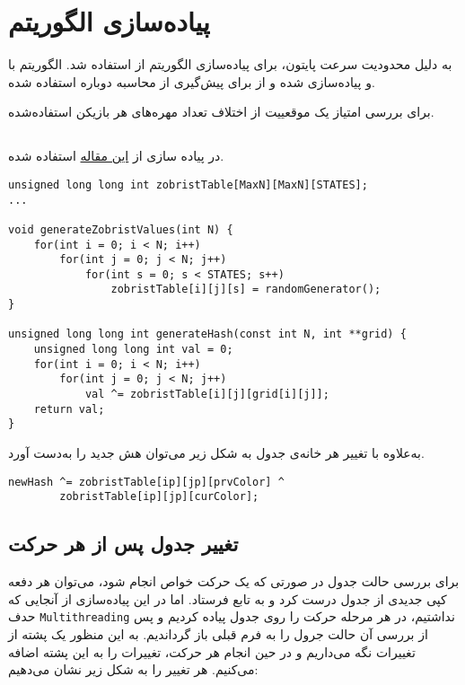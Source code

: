 \chapter{پیاده‌سازی الگوریتم }
به دلیل محدودیت سرعت پایتون، برای پیاده‌سازی الگوریتم
از 
استفاده شد.
الگوریتم با 
و
پیاده‌سازی شده
و از 
برای پیش‌گیری از محاسبه دوباره استفاده شده.

برای بررسی امتیاز یک موقعییت از اختلاف تعداد مهره‌های هر بازیکن استفاده‌شده.

\section{}
در پیاده سازی 
از
\href{https://www.geeksforgeeks.org/minimax-algorithm-in-game-theory-set-5-zobrist-hashing/}{این مقاله}
استفاده شده.

\lstset{language=C++}
\begin{latin}
\begin{lstlisting}
unsigned long long int zobristTable[MaxN][MaxN][STATES];
...

void generateZobristValues(int N) {
	for(int i = 0; i < N; i++)
		for(int j = 0; j < N; j++)
			for(int s = 0; s < STATES; s++)
				zobristTable[i][j][s] = randomGenerator();
}

unsigned long long int generateHash(const int N, int **grid) {
	unsigned long long int val = 0;
	for(int i = 0; i < N; i++)
		for(int j = 0; j < N; j++)
			val ^= zobristTable[i][j][grid[i][j]];
	return val;
}
\end{lstlisting}
\end{latin}

به‌علاوه با تغییر هر خانه‌ی جدول به شکل زیر می‌توان هش جدید را به‌دست آورد.

\begin{latin}
\begin{lstlisting}
newHash ^= zobristTable[ip][jp][prvColor] ^ 
		zobristTable[ip][jp][curColor];

\end{lstlisting}
\end{latin}

\section{تغییر جدول پس از هر حرکت}
برای بررسی حالت جدول در صورتی که یک حرکت خواص انجام شود، می‌توان هر دفعه کپی جدیدی از جدول درست کرد و به تابع فرستاد. اما در این پیاده‌سازی از آنجایی که حدف
\verb;Multithreading;
نداشتیم، در هر مرحله حرکت را روی جدول پیاده کردیم و پس از بررسی آن حالت جرول را به فرم قبلی باز گرداندیم.
به این منظور یک پشته
از تغییرات نگه می‌داریم و  در حین انجام هر حرکت، تغییرات را به این پشته اضافه می‌کنیم.
هر تغییر را به شکل زیر نشان می‌دهیم:


